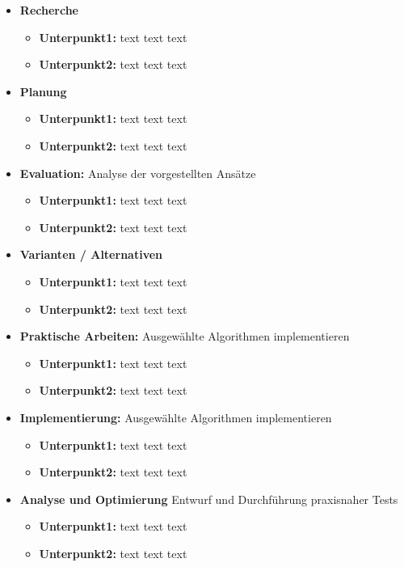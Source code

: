 \documentclass[lang=ngerman,inputenc=utf8,fontsize=10pt]{ldvarticle}
\begin{document}
\begin{itemize}
	\item \textbf{Recherche}
		\begin{itemize}
			\item \textbf{Unterpunkt1:} text text text
			\item \textbf{Unterpunkt2:} text text text
		\end{itemize}
	\item \textbf{Planung}
		\begin{itemize}
			\item \textbf{Unterpunkt1:} text text text
			\item \textbf{Unterpunkt2:} text text text
		\end{itemize}
	\item \textbf{Evaluation:} Analyse der vorgestellten Ansätze
		\begin{itemize}
			\item \textbf{Unterpunkt1:} text text text
			\item \textbf{Unterpunkt2:} text text text
		\end{itemize}
	\item \textbf{Varianten / Alternativen}  
		\begin{itemize}
			\item \textbf{Unterpunkt1:} text text text
			\item \textbf{Unterpunkt2:} text text text
		\end{itemize}
	\item \textbf{Praktische Arbeiten:} Ausgewählte Algorithmen implementieren 
		\begin{itemize}
			\item \textbf{Unterpunkt1:} text text text
			\item \textbf{Unterpunkt2:} text text text 
		\end{itemize}
	\item \textbf{Implementierung:} Ausgewählte Algorithmen implementieren 
		\begin{itemize}
			\item \textbf{Unterpunkt1:} text text text
			\item \textbf{Unterpunkt2:} text text text 
		\end{itemize}
	\item \textbf{Analyse und Optimierung} Entwurf und Durchführung praxisnaher Tests
		\begin{itemize}
			\item \textbf{Unterpunkt1:} text text text
			\item \textbf{Unterpunkt2:} text text text

\end{itemize}
\end{itemize}
\end{document}
